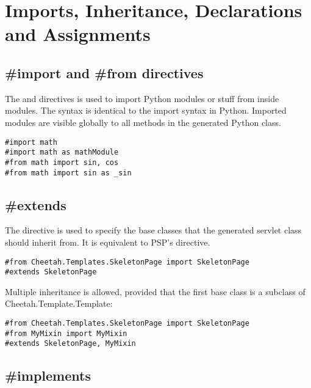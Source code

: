 \section{Imports, Inheritance, Declarations and Assignments}
\label{inheritanceEtc}


\subsection{\#import and \#from directives}
\label{inheritanceEtc.extend}

The  and  directives is used to import Python
modules or stuff from inside modules.  The syntax is identical to the import
syntax in Python.  Imported modules are visible globally to all methods in the
generated Python class.

\begin{verbatim}
#import math
#import math as mathModule
#from math import sin, cos
#from math import sin as _sin
\end{verbatim}

\subsection{\#extends}
\label{inheritanceEtc.extends}

The  directive is used to specify the base classes that the
generated servlet class should inherit from.  It is equivalent to PSP's
 directive.

\begin{verbatim}
#from Cheetah.Templates.SkeletonPage import SkeletonPage
#extends SkeletonPage
\end{verbatim}

Multiple inheritance is allowed, provided that the first base class is a
subclass of Cheetah.Template.Template:

\begin{verbatim}
#from Cheetah.Templates.SkeletonPage import SkeletonPage
#from MyMixin import MyMixin
#extends SkeletonPage, MyMixin
\end{verbatim}


\subsection{\#implements}
\label{inheritanceEtc.def}

